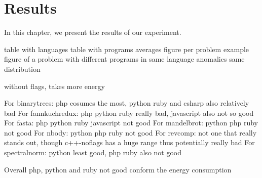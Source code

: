 \chapter{Results}
\label{ch:results}
In this chapter, we present the results of our experiment. 

table with languages
table with programs averages
figure per problem
example figure of a problem with different programs in same language
anomalies
same distribution

without flags, takes more energy

For binarytrees: php cosumes the most, python ruby and csharp also relatively bad 
For fannkuchredux: php python ruby really bad, javascript also not so good
For fasta: php python ruby javascript not good
For mandelbrot: python php ruby not good
For nbody: python php ruby not good
For revcomp: not one that really stands out, though c++-noflags has a huge range thus potentially really bad
For spectralnorm: python least good, php ruby also not good

Overall php, python and ruby not good conform the energy consumption